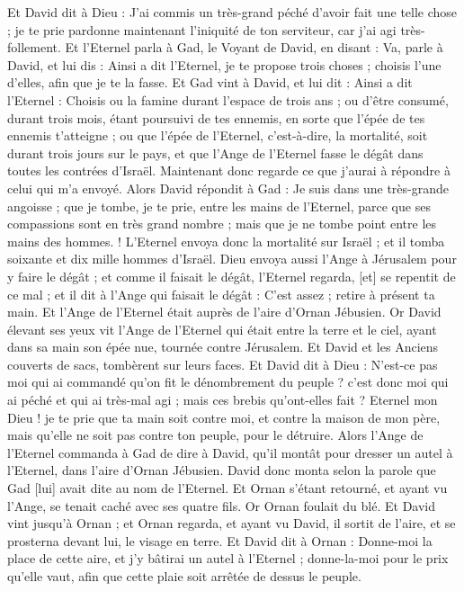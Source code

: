 \begin{multicols}{2}
Et David dit à Dieu : J'ai commis un très-grand péché d'avoir fait une telle chose ; je te prie pardonne maintenant l'iniquité de ton serviteur, car j'ai agi très-follement.
Et l'Eternel parla à Gad, le Voyant de David, en disant :
Va, parle à David, et lui dis : Ainsi a dit l'Eternel, je te propose trois choses ; choisis l'une d'elles, afin que je te la fasse.
Et Gad vint à David, et lui dit : Ainsi a dit l'Eternel :
Choisis ou la famine durant l'espace de trois ans ; ou d'être consumé, durant trois mois, étant poursuivi de tes ennemis, en sorte que l'épée de tes ennemis t'atteigne ; ou que l'épée de l'Eternel, c'est-à-dire, la mortalité, soit durant trois jours sur le pays, et que l'Ange de l'Eternel fasse le dégât dans toutes les contrées d'Israël. Maintenant donc regarde ce que j'aurai à répondre à celui qui m'a envoyé.
Alors David répondit à Gad : Je suis dans une très-grande angoisse ; que je tombe, je te prie, entre les mains de l'Eternel, parce que ses compassions sont en très grand nombre ; mais que je ne tombe point entre les mains des hommes. !
L'Eternel envoya donc la mortalité sur Israël ; et il tomba soixante et dix mille hommes d'Israël.
Dieu envoya aussi l'Ange à Jérusalem pour y faire le dégât ; et comme il faisait le dégât, l'Eternel regarda, [et] se repentit de ce mal ; et il dit à l'Ange qui faisait le dégât : C'est assez ; retire à présent ta main. Et l'Ange de l'Eternel était auprès de l'aire d'Ornan Jébusien.
Or David élevant ses yeux vit l'Ange de l'Eternel qui était entre la terre et le ciel, ayant dans sa main son épée nue, tournée contre Jérusalem. Et David et les Anciens couverts de sacs, tombèrent sur leurs faces.
Et David dit à Dieu : N'est-ce pas moi qui ai commandé qu'on fit le dénombrement du peuple ? c'est donc moi qui ai péché et qui ai très-mal agi ; mais ces brebis qu'ont-elles fait ? Eternel mon Dieu ! je te prie que ta main soit contre moi, et contre la maison de mon père, mais qu'elle ne soit pas contre ton peuple, pour le détruire.
Alors l'Ange de l'Eternel commanda à Gad de dire à David, qu'il montât pour dresser un autel à l'Eternel, dans l'aire d'Ornan Jébusien.
David donc monta selon la parole que Gad [lui] avait dite au nom de l'Eternel.
Et Ornan s'étant retourné, et ayant vu l'Ange, se tenait caché avec ses quatre fils. Or Ornan foulait du blé.
Et David vint jusqu'à Ornan ; et Ornan regarda, et ayant vu David, il sortit de l'aire, et se prosterna devant lui, le visage en terre.
Et David dit à Ornan : Donne-moi la place de cette aire, et j'y bâtirai un autel à l'Eternel ; donne-la-moi pour le prix qu'elle vaut, afin que cette plaie soit arrêtée de dessus le peuple.

\end{multicols}
